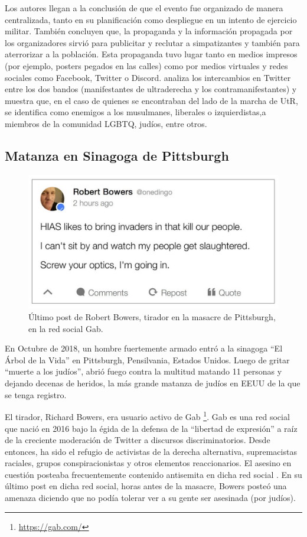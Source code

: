 Los autores llegan a la conclusión de que el evento fue organizado de manera centralizada, tanto en su planificación como despliegue en un intento de ejercicio militar. También concluyen que, la propaganda y la información propagada por los organizadores sirvió para publicitar y reclutar a simpatizantes y también para aterrorizar a la población. Esta propaganda tuvo lugar tanto en medios impresos (por ejemplo, posters pegados en las calles) como por medios virtuales y redes sociales como Facebook, Twitter o Discord. \citet{klein2019twitter} analiza los intercambios en Twitter entre los dos bandos (manifestantes de ultraderecha y los contramanifestantes) y muestra que, en el caso de quienes se encontraban del lado de la marcha de UtR, se identifica como enemigos a los musulmanes, liberales o izquierdistas,a miembros de la comunidad LGBTQ, judíos, entre otros.


\subsection{Matanza en Sinagoga de Pittsburgh}


\begin{figure}[t]
    \centering
    \includegraphics[height=6cm, keepaspectratio]{img/gab-pittsburgh-post.jpg}
    \caption{Último post de Robert Bowers, tirador en la masacre de Pittsburgh, en la red social Gab.}
    \label{fig:gab_post}
\end{figure}


En Octubre de 2018, un hombre fuertemente armado entró a la sinagoga ``El Árbol de la Vida'' en Pittsburgh, Pensilvania, Estados Unidos. Luego de gritar ``muerte a los judíos'', abrió fuego contra la multitud matando 11 personas y dejando decenas de heridos, la más grande matanza de judíos en EEUU de la que se tenga registro.

El tirador, Richard Bowers, era usuario activo de Gab \footnote{\url{https://gab.com/}}. Gab es una red social que nació en 2016 bajo la égida de la defensa de la ``libertad de expresión'' a raíz de la creciente moderación de Twitter a discursos discriminatorios. Desde entonces, ha sido el refugio de activistas de la derecha alternativa, supremacistas raciales, grupos conspiracionistas y otros elementos reaccionarios. El asesino en cuestión posteaba frecuentemente contenido antisemita en dicha red social \cite{mcilroy2019welcome}. En su último post en dicha red social, horas antes de la masacre, Bowers posteó una amenaza diciendo que no podía tolerar ver a su gente ser asesinada (por judíos).

